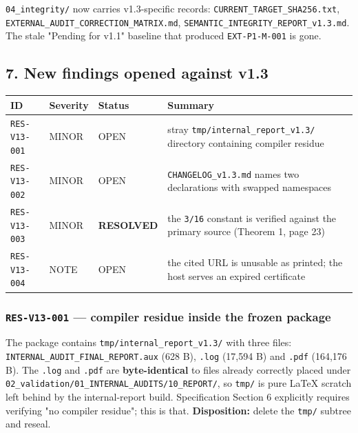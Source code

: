 \documentclass[
  9pt,
  a4paper,
]{article}
\newcounter{none} %
\begin{document}
\texttt{04\_integrity/} now carries v1.3-specific records:
\texttt{CURRENT\_TARGET\_SHA256.txt},
\texttt{EXTERNAL\_AUDIT\_CORRECTION\_MATRIX.md},
\texttt{SEMANTIC\_INTEGRITY\_REPORT\_v1.3.md}. The stale "Pending for
v1.1" baseline that produced \texttt{EXT-P1-M-001} is gone.

\subsection{7. New findings opened against
v1.3}\label{7-new-findings-opened-against-v13}

{\def\LTcaptype{none} %
\begin{longtable}[]{@{}llll@{}}
\toprule\noalign{}
ID & Severity & Status & Summary \\
\midrule\noalign{}
\endhead
\bottomrule\noalign{}
\endlastfoot
\texttt{RES-V13-001} & MINOR & OPEN & stray
\texttt{tmp/internal\_report\_v1.3/} directory containing compiler
residue \\
\texttt{RES-V13-002} & MINOR & OPEN & \texttt{CHANGELOG\_v1.3.md} names
two declarations with swapped namespaces \\
\texttt{RES-V13-003} & MINOR & \textbf{RESOLVED} & the \texttt{3/16}
constant is verified against the primary source (Theorem 1, page 23) \\
\texttt{RES-V13-004} & NOTE & OPEN & the cited URL is unusable as
printed; the host serves an expired certificate \\
\end{longtable}
}

\subsubsection{\texorpdfstring{\texttt{RES-V13-001} --- compiler residue
inside the frozen
package}{RES-V13-001 --- compiler residue inside the frozen package}}\label{res-v13-001--compiler-residue-inside-the-frozen-package}

The package contains \texttt{tmp/internal\_report\_v1.3/} with three
files: \texttt{INTERNAL\_AUDIT\_FINAL\_REPORT.aux} (628 B),
\texttt{.log} (17,594 B) and \texttt{.pdf} (164,176 B). The
\texttt{.log} and \texttt{.pdf} are \textbf{byte-identical} to files
already correctly placed under
\texttt{02\_validation/01\_INTERNAL\_AUDITS/10\_REPORT/}, so
\texttt{tmp/} is pure LaTeX scratch left behind by the internal-report
build. Specification Section 6 explicitly requires verifying "no
compiler residue"; this is that. \textbf{Disposition:} delete the
\texttt{tmp/} subtree and reseal.
\end{document}
